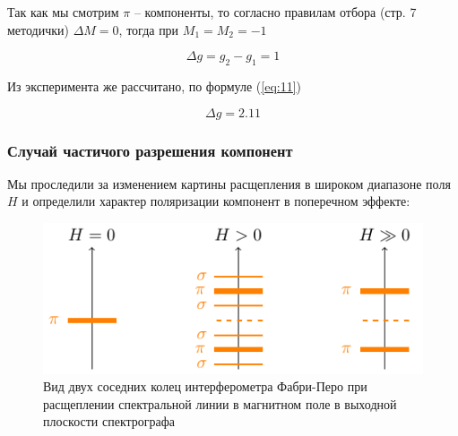 Так как мы смотрим $\pi$ -- компоненты, то согласно правилам отбора (стр. 7 методички) $\Delta M=0$, тогда при $M_1=M_2=-1$

\begin{equation}
	\Delta g=g_2-g_1=1
\end{equation}

Из эксперимента же рассчитано, по формуле (\ref{eq:11})

\begin{equation}
	\Delta g=2.11
\end{equation}

\subsubsection{Случай частичого разрешения компонент}

Мы проследили за изменением картины расщепления в широком диапазоне поля $H$ и определили характер поляризации компонент в поперечном эффекте:

\begin{figure}[H]
	\centering
	\includegraphics[scale=1]{ris/5}
	\caption{Вид двух соседних колец интерферометра Фабри-Перо при расщеплении спектральной линии в магнитном поле в выходной плоскости спектрографа}
	\label{fig:ris5}
\end{figure}
